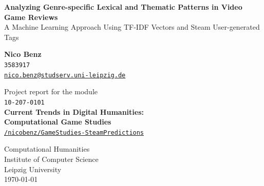\documentclass[11pt, a4paper]{article}
\begin{document}
\onehalfspacing

\begin{titlepage}
    \begin{center}
        \vspace*{1cm}
        \huge
        \textbf{Analyzing Genre-specific Lexical and Thematic Patterns in Video Game Reviews}\\
        A Machine Learning Approach Using TF-IDF Vectors and Steam User-generated Tags

        \vfill
        
        \LARGE   
        \textbf{Nico Benz}\\
        \texttt{3583917}\\
        \href{mailto:nico.benz@studserv.uni-leipzig.de}{\texttt{nico.benz@studserv.uni-leipzig.de}}
        
            
         \vfill
            
        Project report for the module\\
        \texttt{10-207-0101}\\
        \textbf{Current Trends in Digital Humanities:}\\
        \textbf{Computational Game Studies}\\
        
          \vfill
         \href{https://github.com/nicobenz/GameStudies-SteamPredictions}{\texttt{\faGithub{}/nicobenz/GameStudies-SteamPredictions}}
           
        
         \vfill   
        \Large
        Computational Humanities\\
        Institute of Computer Science\\
        Leipzig University\\
        \vspace{\baselineskip}
        \today
        
            
    \end{center}
\end{titlepage}
\end{document}

